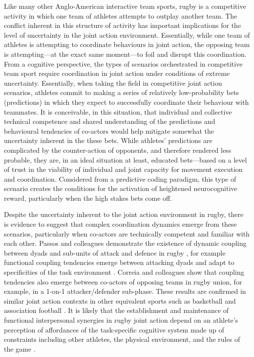 \begin{CJK}{UTF8}{gbsn}
Like many other Anglo-American interactive team sports, rugby is a competitive activity in which one team of athletes attempts to outplay another team.  The conflict inherent in this structure of activity has important implications for the level of uncertainty in the joint action environment.  Essentially, while one team of athletes is attempting to coordinate behaviours in joint action, the opposing team is attempting---at the exact same moment---to foil and disrupt this coordination.  From a cognitive perspective, the types of scenarios orchestrated in competitive team sport require coordination in joint action under conditions of extreme uncertainty.  Essentially, when taking the field in competitive joint action scenarios, athletes commit to making a series of relatively low-probability bets (predictions) in which they expect to successfully coordinate their behaviour with teammates.  It is conceivable, in this situation, that individual and collective technical competence and shared understanding of the predictions and behavioural tendencies of co-actors would help mitigate somewhat the uncertainty inherent in the these bets.  While athletes' predictions are complicated by the counter-action of opponents, and therefore rendered less probable, they are, in an ideal situation at least, educated bets---based on a level of trust in the viability of individual and joint capacity for movement execution and coordination.  Considered from a predictive coding paradigm, this type of scenario creates the conditions for the activation of heightened neurocognitive reward, particularly when the high stakes bets come off.

Despite the uncertainty inherent to the joint action environment in rugby, there is evidence to suggest that complex coordination dynamics emerge from these scenarios, particularly when co-actors are technically competent and familiar with each other. Passos and colleagues demonstrate the existence of dynamic coupling between dyads and sub-units of attack and defence in rugby \citep{Passos2011,Correia2014}, for example functional coupling tendencies emerge between attacking dyads and adapt to specificities of the task environment \textcite{Passos2011}.  Correia and colleagues \textcite{Correia2014} show that coupling tendencies also emerge between co-actors of opposing teams in rugby union, for example, in a 1-on-1 attacker/defender sub-phase.  These results are confirmed in similar joint action contexts in other equivalent sports such as basketball and association football \citep{Duarte2013}. It is likely that the establishment and maintenance of functional interpersonal synergies in rugby joint action depend on an athlete's perception of affordances of the task-specific cognitive system made up of constraints including other athletes, the physical environment, and the rules of the game \citep{Passos2012}.


\end{CJK}
